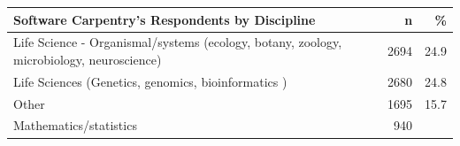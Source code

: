 \documentclass[]{article}
\begin{document}
\begin{longtable}[]{@{}lrr@{}}
\toprule
\begin{minipage}[b]{0.81\columnwidth}\raggedright\strut
Software Carpentry's Respondents by Discipline\strut
\end{minipage} & \begin{minipage}[b]{0.05\columnwidth}\raggedleft\strut
n\strut
\end{minipage} & \begin{minipage}[b]{0.05\columnwidth}\raggedleft\strut
\%\strut
\end{minipage}\tabularnewline
\midrule
\endhead
\begin{minipage}[t]{0.81\columnwidth}\raggedright\strut
Life Science - Organismal/systems (ecology, botany, zoology,
microbiology, neuroscience)\strut
\end{minipage} & \begin{minipage}[t]{0.05\columnwidth}\raggedleft\strut
2694\strut
\end{minipage} & \begin{minipage}[t]{0.05\columnwidth}\raggedleft\strut
24.9\strut
\end{minipage}\tabularnewline
\begin{minipage}[t]{0.81\columnwidth}\raggedright\strut
Life Sciences (Genetics, genomics, bioinformatics )\strut
\end{minipage} & \begin{minipage}[t]{0.05\columnwidth}\raggedleft\strut
2680\strut
\end{minipage} & \begin{minipage}[t]{0.05\columnwidth}\raggedleft\strut
24.8\strut
\end{minipage}\tabularnewline
\begin{minipage}[t]{0.81\columnwidth}\raggedright\strut
Other\strut
\end{minipage} & \begin{minipage}[t]{0.05\columnwidth}\raggedleft\strut
1695\strut
\end{minipage} & \begin{minipage}[t]{0.05\columnwidth}\raggedleft\strut
15.7\strut
\end{minipage}\tabularnewline
\begin{minipage}[t]{0.81\columnwidth}\raggedright\strut
Mathematics/statistics\strut
\end{minipage} & \begin{minipage}[t]{0.05\columnwidth}\raggedleft\strut
940\strut
\end{minipage} & \begin{minipage}[t]{0.05\columnwidth}\raggedleft\strut

\end{minipage}
\end{longtable}
\end{document}
